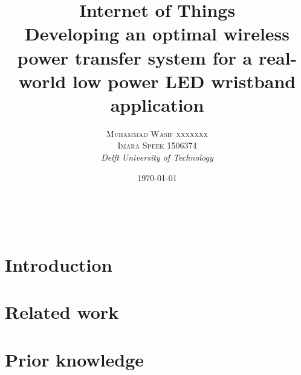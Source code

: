 \documentclass[a4paper, 10pt]{article}
\title{\textbf{Internet of Things }\\ %
Developing an optimal wireless power transfer system for a real-world low power LED wristband application} %
\author{\textsc{Muhammad Wasif xxxxxxx\\
Imara Speek 1506374} %
\\{\textit{Delft University of Technology}}} %
\date{\today} %
\makeatletter
\renewcommand{\maketitle}{ %
\begin{flushright} %
{\LARGE\@title} %

\vspace{50pt} %

{\large\@author} %
\\\@date %


\vspace{40pt} %
\end{flushright}
}
\makeatother
\begin{document}
\maketitle %



%
%


\section{Introduction}
\label{sec:intro}




\section{Related work}
\label{sec:related}




\section{Prior knowledge}
\label{sec:prior}

\end{document}
